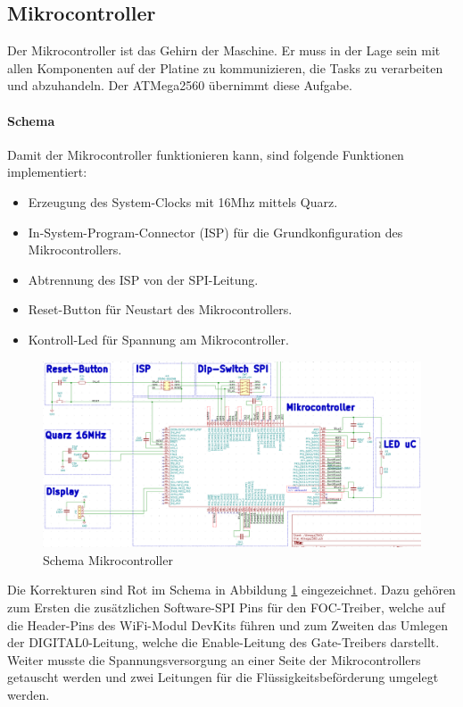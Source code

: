 \subsection{Mikrocontroller}
\label{subsec:Mikrocontroller}

Der Mikrocontroller ist das Gehirn der Maschine. Er muss in der Lage sein mit allen Komponenten auf der Platine zu kommunizieren, die Tasks zu verarbeiten und abzuhandeln. Der ATMega2560 übernimmt diese Aufgabe.


\paragraph{Schema}\mbox{}

Damit der Mikrocontroller funktionieren kann, sind folgende Funktionen implementiert:
\begin{itemize}
\item Erzeugung des System-Clocks mit 16Mhz mittels Quarz.
\item In-System-Program-Connector (ISP) für die Grundkonfiguration des Mikrocontrollers.
\item Abtrennung des ISP von der SPI-Leitung.
\item Reset-Button für Neustart des Mikrocontrollers.
\item Kontroll-Led für Spannung am Mikrocontroller.
\end{itemize}

\begin{figure}[H]
\center
\includegraphics[width = \textwidth]{graphics/Schema_uC}
\caption{Schema Mikrocontroller}
\label{fig:Schema_uC}
\end{figure}

Die Korrekturen sind Rot im Schema in Abbildung \ref{fig:Schema_uC} eingezeichnet. Dazu gehören zum Ersten die zusätzlichen Software-SPI Pins für den FOC-Treiber, welche auf die Header-Pins des WiFi-Modul DevKits führen und zum Zweiten das Umlegen der DIGITAL0-Leitung, welche die Enable-Leitung des Gate-Treibers darstellt. Weiter musste die Spannungsversorgung an einer Seite der Mikrocontrollers getauscht werden und zwei Leitungen für die Flüssigkeitsbeförderung umgelegt werden.

